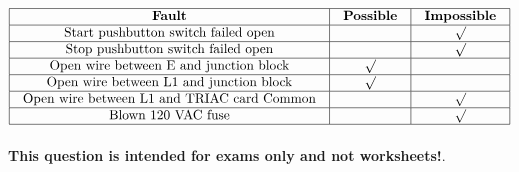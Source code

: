 






$$\vbox{\offinterlineskip
\halign{\strut
\vrule \quad\hfil # \ \hfil & 
\vrule \quad\hfil # \ \hfil & 
\vrule \quad\hfil # \ \hfil \vrule \cr
\noalign{\hrule}
%
{\bf Fault} & {\bf Possible} & {\bf Impossible} \cr
%
\noalign{\hrule}
%
Start pushbutton switch failed open &  & $\surd$ \cr
%
\noalign{\hrule}
%
Stop pushbutton switch failed open &  & $\surd$ \cr
%
\noalign{\hrule}
%
Open wire between E and junction block & $\surd$ &  \cr
%
\noalign{\hrule}
%
Open wire between L1 and junction block & $\surd$ &  \cr
%
\noalign{\hrule}
%
Open wire between L1 and TRIAC card Common &  & $\surd$ \cr
%
\noalign{\hrule}
%
Blown 120 VAC fuse &  & $\surd$ \cr
%
\noalign{\hrule}
} %
}$$ %







{\bf This question is intended for exams only and not worksheets!}.


